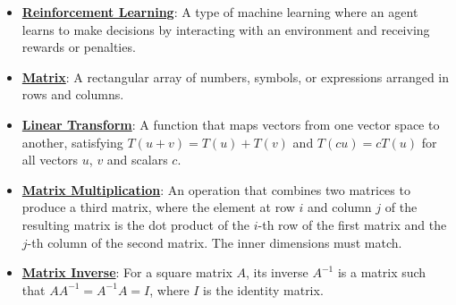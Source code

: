 \documentclass{article}%
\begin{document}
\begin{itemize}[leftmargin=*]
\item \href{https://purdue.brightspace.com/d2l/common/assets/pdfjs-d2l-dist/1.0.14-legacy/web/viewer.html?file=%2Fcontent%2Fenforced%2F1095467-wl.202510.CS.24300.001%2F02L2-Intro.pdf%3Fou%3D1095467&lang=en-us&container=d2l-fileviewer-rendered-pdf&fullscreen=d2l-fileviewer-rendered-pdf-dialog&height=667#page=46}{\textbf{Reinforcement Learning}}: A type of machine learning where an agent learns to make decisions by interacting with an environment and receiving rewards or penalties.%
\end{itemize}%
\begin{itemize}[leftmargin=*]%
\item \href{https://purdue.brightspace.com/d2l/common/assets/pdfjs-d2l-dist/1.0.14-legacy/web/viewer.html?file=%2Fcontent%2Fenforced%2F1095467-wl.202510.CS.24300.001%2F04L1-Linear Algebra Primer.pdf%3Fou%3D1095467&lang=en-us&container=d2l-fileviewer-rendered-pdf&fullscreen=d2l-fileviewer-rendered-pdf-dialog&height=667#page=4}{\textbf{Matrix}}: A rectangular array of numbers, symbols, or expressions arranged in rows and columns.%
\item \href{https://purdue.brightspace.com/d2l/common/assets/pdfjs-d2l-dist/1.0.14-legacy/web/viewer.html?file=%2Fcontent%2Fenforced%2F1095467-wl.202510.CS.24300.001%2F04L1-Linear Algebra Primer.pdf%3Fou%3D1095467&lang=en-us&container=d2l-fileviewer-rendered-pdf&fullscreen=d2l-fileviewer-rendered-pdf-dialog&height=667#page=5}{\textbf{Linear Transform}}: A function that maps vectors from one vector space to another, satisfying $T(u + v) = T(u) + T(v)$ and $T(cu) = cT(u)$ for all vectors $u$, $v$ and scalars $c$.%
\item \href{https://purdue.brightspace.com/d2l/common/assets/pdfjs-d2l-dist/1.0.14-legacy/web/viewer.html?file=%2Fcontent%2Fenforced%2F1095467-wl.202510.CS.24300.001%2F04L1-Linear Algebra Primer.pdf%3Fou%3D1095467&lang=en-us&container=d2l-fileviewer-rendered-pdf&fullscreen=d2l-fileviewer-rendered-pdf-dialog&height=667#page=14}{\textbf{Matrix Multiplication}}: An operation that combines two matrices to produce a third matrix, where the element at row $i$ and column $j$ of the resulting matrix is the dot product of the $i$-th row of the first matrix and the $j$-th column of the second matrix. The inner dimensions must match.%
\item \href{https://purdue.brightspace.com/d2l/common/assets/pdfjs-d2l-dist/1.0.14-legacy/web/viewer.html?file=%2Fcontent%2Fenforced%2F1095467-wl.202510.CS.24300.001%2F04L1-Linear Algebra Primer.pdf%3Fou%3D1095467&lang=en-us&container=d2l-fileviewer-rendered-pdf&fullscreen=d2l-fileviewer-rendered-pdf-dialog&height=667#page=10}{\textbf{Matrix Inverse}}: For a square matrix $A$, its inverse $A^{-1}$ is a matrix such that $AA^{-1} = A^{-1}A = I$, where $I$ is the identity matrix.%

\end{itemize}
\end{document}
